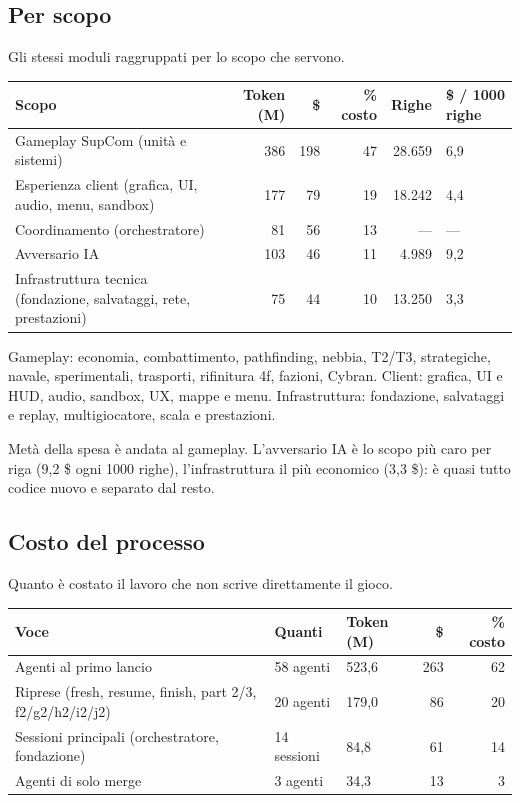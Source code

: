 \documentclass[11pt]{article}
\begin{document}
\subsection{Per scopo}
\label{sec:orgd1a423c}
Gli stessi moduli raggruppati per lo scopo che servono.

\begin{center}
\begin{tabular}{lrrrrl}
Scopo & Token (M) & \$ & \% costo & Righe & \$ / 1000 righe\\
\hline
Gameplay SupCom (unità e sistemi) & 386 & 198 & 47 & 28.659 & 6,9\\
Esperienza client (grafica, UI, audio, menu, sandbox) & 177 & 79 & 19 & 18.242 & 4,4\\
Coordinamento (orchestratore) & 81 & 56 & 13 & — & —\\
Avversario IA & 103 & 46 & 11 & 4.989 & 9,2\\
Infrastruttura tecnica (fondazione, salvataggi, rete, prestazioni) & 75 & 44 & 10 & 13.250 & 3,3\\
\end{tabular}
\end{center}

Gameplay: economia, combattimento, pathfinding, nebbia, T2/T3, strategiche, navale, sperimentali, trasporti,
rifinitura 4f, fazioni, Cybran. Client: grafica, UI e HUD, audio, sandbox, UX, mappe e menu. Infrastruttura:
fondazione, salvataggi e replay, multigiocatore, scala e prestazioni.

Metà della spesa è andata al gameplay. L'avversario IA è lo scopo più caro per riga (9,2 \$ ogni 1000 righe),
l'infrastruttura il più economico (3,3 \$): è quasi tutto codice nuovo e separato dal resto.
\subsection{Costo del processo}
\label{sec:org196e259}
Quanto è costato il lavoro che non scrive direttamente il gioco.

\begin{center}
\begin{tabular}{lllrr}
Voce & Quanti & Token (M) & \$ & \% costo\\
\hline
Agenti al primo lancio & 58 agenti & 523,6 & 263 & 62\\
Riprese (fresh, resume, finish, part 2/3, f2/g2/h2/i2/j2) & 20 agenti & 179,0 & 86 & 20\\
Sessioni principali (orchestratore, fondazione) & 14 sessioni & 84,8 & 61 & 14\\
Agenti di solo merge & 3 agenti & 34,3 & 13 & 3\\
\end{tabular}
\end{center}
\end{document}
